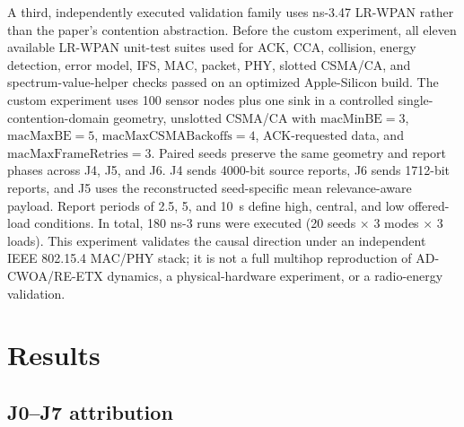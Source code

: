 \documentclass[pdflatex,sn-mathphys-num]{sn-jnl}
\begin{document}
A third, independently executed validation family uses ns-3.47 LR-WPAN rather than the paper's contention abstraction. Before the custom experiment, all eleven available LR-WPAN unit-test suites used for ACK, CCA, collision, energy detection, error model, IFS, MAC, packet, PHY, slotted CSMA/CA, and spectrum-value-helper checks passed on an optimized Apple-Silicon build. The custom experiment uses 100 sensor nodes plus one sink in a controlled single-contention-domain geometry, unslotted CSMA/CA with $\mathrm{macMinBE}=3$, $\mathrm{macMaxBE}=5$, $\mathrm{macMaxCSMABackoffs}=4$, ACK-requested data, and $\mathrm{macMaxFrameRetries}=3$. Paired seeds preserve the same geometry and report phases across J4, J5, and J6. J4 sends 4000-bit source reports, J6 sends 1712-bit reports, and J5 uses the reconstructed seed-specific mean relevance-aware payload. Report periods of 2.5, 5, and 10~s define high, central, and low offered-load conditions. In total, 180 ns-3 runs were executed (20 seeds $\times$ 3 modes $\times$ 3 loads). This experiment validates the causal direction under an independent IEEE 802.15.4 MAC/PHY stack; it is not a full multihop reproduction of AD-CWOA/RE-ETX dynamics, a physical-hardware experiment, or a radio-energy validation.

\section{Results}

\subsection{J0--J7 attribution}

\begin{table}[t]
\caption{Stage-A mean outcomes over twenty frozen seeds.}
\label{tab:means}
\centering
\scriptsize
{}
\end{table}
\end{document}
